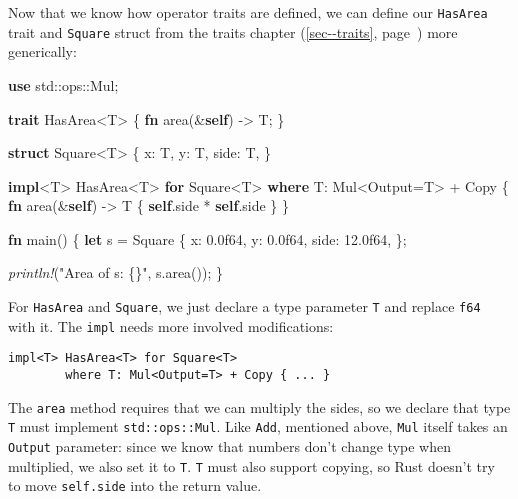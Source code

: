 \documentclass[a4paper,]{book}
\renewcommand*{\hyperref}[2][\ar]{%
  \def\ar{#2}%
  #2 (\autoref{#1}, page~\pageref{#1})}
\newenvironment{Shaded}{\begin{snugshade}}{\end{snugshade}}
\newcommand{\KeywordTok}[1]{\textcolor[rgb]{0.13,0.29,0.53}{\textbf{{#1}}}}
\newcommand{\DecValTok}[1]{\textcolor[rgb]{0.00,0.00,0.81}{{#1}}}
\newcommand{\StringTok}[1]{\textcolor[rgb]{0.31,0.60,0.02}{{#1}}}
\newcommand{\BuiltInTok}[1]{{#1}}
\newcommand{\PreprocessorTok}[1]{\textcolor[rgb]{0.56,0.35,0.01}{\textit{{#1}}}}
\newcommand{\NormalTok}[1]{{#1}}
\begin{document}
Now that we know how operator traits are defined, we can define our
\texttt{HasArea} trait and \texttt{Square} struct from the
\hyperref[sec--traits]{traits chapter} more generically:

\begin{Shaded}
\begin{Highlighting}[]
\KeywordTok{use} \NormalTok{std::ops::Mul;}

\KeywordTok{trait} \NormalTok{HasArea<T> \{}
    \KeywordTok{fn} \NormalTok{area(&}\KeywordTok{self}\NormalTok{) -> T;}
\NormalTok{\}}

\KeywordTok{struct} \NormalTok{Square<T> \{}
    \NormalTok{x: T,}
    \NormalTok{y: T,}
    \NormalTok{side: T,}
\NormalTok{\}}

\KeywordTok{impl}\NormalTok{<T> HasArea<T> }\KeywordTok{for} \NormalTok{Square<T>}
        \KeywordTok{where} \NormalTok{T: Mul<Output=T> + }\BuiltInTok{Copy} \NormalTok{\{}
    \KeywordTok{fn} \NormalTok{area(&}\KeywordTok{self}\NormalTok{) -> T \{}
        \KeywordTok{self}\NormalTok{.side * }\KeywordTok{self}\NormalTok{.side}
    \NormalTok{\}}
\NormalTok{\}}

\KeywordTok{fn} \NormalTok{main() \{}
    \KeywordTok{let} \NormalTok{s = Square \{}
        \NormalTok{x: }\DecValTok{0.0f64}\NormalTok{,}
        \NormalTok{y: }\DecValTok{0.0f64}\NormalTok{,}
        \NormalTok{side: }\DecValTok{12.0f64}\NormalTok{,}
    \NormalTok{\};}

    \PreprocessorTok{println!}\NormalTok{(}\StringTok{"Area of s: \{\}"}\NormalTok{, s.area());}
\NormalTok{\}}
\end{Highlighting}
\end{Shaded}

For \texttt{HasArea} and \texttt{Square}, we just declare a type
parameter \texttt{T} and replace \texttt{f64} with it. The \texttt{impl}
needs more involved modifications:

\begin{verbatim}
impl<T> HasArea<T> for Square<T>
        where T: Mul<Output=T> + Copy { ... }
\end{verbatim}

The \texttt{area} method requires that we can multiply the sides, so we
declare that type \texttt{T} must implement \texttt{std::ops::Mul}. Like
\texttt{Add}, mentioned above, \texttt{Mul} itself takes an
\texttt{Output} parameter: since we know that numbers don't change type
when multiplied, we also set it to \texttt{T}. \texttt{T} must also
support copying, so Rust doesn't try to move \texttt{self.side} into the
return value.
\end{document}
